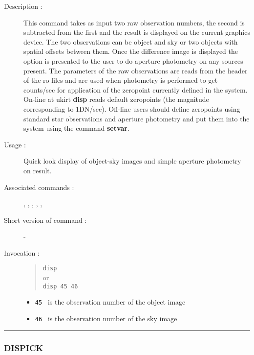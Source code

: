 \begin{description}

\item[Description :] This command takes as input two raw observation
numbers, the second is subtracted from the first and the result is
displayed on the current graphics device.  The two observations can be
object and sky or two objects with spatial offsets between them.  Once
the difference image is displayed the option is presented to the user
to do aperture photometry on any sources present.  The parameters of
the raw observations are reads from the header of the {\sc ro} files
and are used when photometry is performed to get counts/sec for
application of the zeropoint currently defined in the system.  On-line
at {\sc ukirt} {\bf disp} reads default zeropoints (the magnitude
corresponding to 1DN/sec).  Off-line users should define zeropoints
using standard star observations and aperture photometry and put them
into the system using the command {\bf setvar}.

\item[Usage :] Quick look display of object-sky images and simple
aperture photometry on result.
\item[Associated commands :] {\tt {}}, 
{\tt {}}, {\tt {}}, 
{\tt {}}, {\tt {}}, 
{\tt {}}
\item[Short version of command :] -
\item[Invocation :]

\begin{quote}{\tt  disp }\\
or \\
{\tt disp 45 46 }
\end{quote}

\begin{itemize}

\item {\tt 45 } is the observation number of the object image
\item {\tt 46 } is the observation number of the sky image
\end{itemize}

\end{description}

\hrule 
\subsubsection*{\label{DISPICK}DISPICK}

